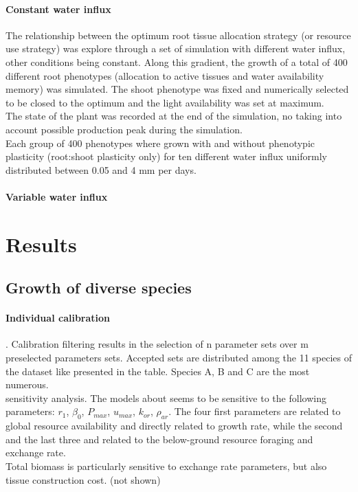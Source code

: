 \documentclass[review]{elsarticle}
\begin{document}
\paragraph{Constant water influx}
The relationship between the optimum root tissue allocation strategy (or resource use strategy) was explore through a set of simulation with different water influx, other conditions being constant. Along this gradient, the growth of a total of 400 different root phenotypes (allocation to active tissues and water availability memory) was simulated. The shoot phenotype was fixed and numerically selected to be closed to the optimum and the light availability was set at maximum.\\
The state of the plant was recorded at the end of the simulation, no taking into account possible production peak during the simulation.\\
Each group of 400 phenotypes where grown with and without phenotypic plasticity (root:shoot plasticity only) for ten different water influx uniformly distributed between 0.05 and 4 mm per days.


\paragraph{Variable water influx}


\section{Results}
\subsection{Growth of diverse species}
\paragraph{Individual calibration}. Calibration filtering results in the selection of n parameter sets over m preselected parameters sets. Accepted sets are distributed among the 11 species of the dataset like presented in the table. Species A, B and C are the most numerous.\\
sensitivity analysis. The models about seems to be sensitive to the following parameters: $r_1$, $\beta_0$, $P_{max}$, $u_{max}$, $k_{or}$, $\rho_{ar}$. The four first parameters are related to global resource availability and directly related to growth rate, while the second and the last three and related to the below-ground resource foraging and exchange rate.\\
Total biomass is particularly sensitive to exchange rate parameters, but also tissue construction cost. (not shown)\\
\end{document}
